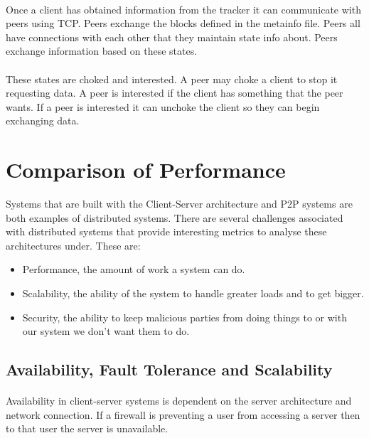 \documentclass[11pt]{amsart}
\begin{document}
\paragraph{}

Once a client has obtained information from the tracker it can communicate with peers using TCP. Peers exchange the blocks defined in the metainfo file. Peers all have connections with each other that they maintain state info about. Peers exchange information based on these states.
\paragraph{}
These states are choked and interested. A peer may choke a client to stop it requesting data. A peer is interested if the client has something that the peer wants. If a peer is interested it can unchoke the client so they can begin exchanging data.

\section{Comparison of Performance}

Systems that are built with the Client-Server architecture and P2P systems are both examples of distributed systems. There are several challenges associated with distributed systems that provide interesting metrics to analyse these architectures under. These are:

\begin{itemize}
  \item Performance, the amount of work a system can do. 
  \item Scalability, the ability of the system to handle greater loads and to get bigger. 
  \item Security, the ability to keep malicious parties from doing things to or with our system we don't want them to do.
\end{itemize}

\subsection{Availability, Fault Tolerance and Scalability}

\paragraph{}

Availability in client-server systems is dependent on the server architecture and network connection. If a firewall is preventing a user from accessing a server then to that user the server is unavailable.
\end{document}
